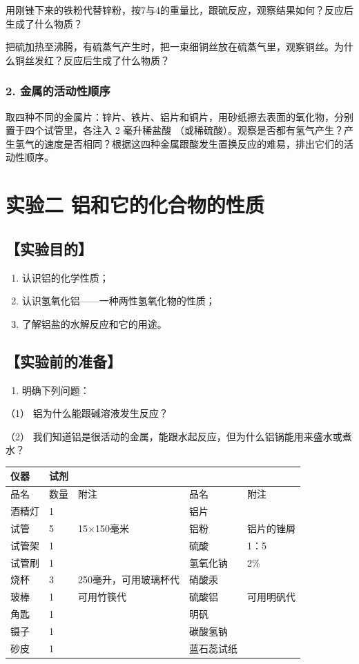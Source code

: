 用刚锉下来的铁粉代替锌粉，按7与4的重量比，跟硫反应，观察结果如何？反应后生成了什么物质？

把硫加热至沸腾，有硫蒸气产生时，把一束细铜丝放在硫蒸气里，观察铜丝。为什么铜丝发红？反应后生成了什么物质？

\subsubsection{2. 金属的活动性顺序}

取四种不同的金属片：锌片、铁片、铝片和铜片，用砂纸擦去表面的氧化物，分别置于四个试管里，各注入
2 毫升稀盐酸
（或稀硫酸）。观察是否都有氢气产生？产生氢气的速度是否相同？根据这四种金属跟酸发生置换反应的难易，排出它们的活动性顺序。

\section{实验二 铝和它的化合物的性质}

\subsection{【实验目的】}

\begin{enumerate}
\item
  认识铝的化学性质；
\item
  认识氢氧化铝------一种两性氢氧化物的性质；
\item
  了解铝盐的水解反应和它的用途。
\end{enumerate}

\subsection{【实验前的准备】}

\begin{enumerate}
\item
  明确下列问题：
\end{enumerate}

（1） 铝为什么能跟碱溶液发生反应？

（2）
我们知道铝是很活动的金属，能跟水起反应，但为什么铝锅能用来盛水或煮水？

{\def\LTcaptype{none} %
\begin{longtable}[]{@{}lllll@{}}
\toprule\noalign{}
仪器 & 试剂 & & & \\
\midrule\noalign{}
\endhead
\bottomrule\noalign{}
\endlastfoot
品名 & 数量 & 附注 & 品名 & 附注 \\
酒精灯 & 1 & & 铝片 & \\
试管 & 5 & 15×150毫米 & 铝粉 & 铝片的锉屑 \\
试管架 & 1 & & 硫酸 & 1：5 \\
试管刷 & 1 & & 氢氧化钠 & 2\% \\
烧杯 & 3 & 250毫升，可用玻璃杯代 & 硝酸汞 & \\
玻棒 & 1 & 可用竹筷代 & 硫酸铝 & 可用明矾代 \\
角匙 & 1 & & 明矾 & \\
镊子 & 1 & & 碳酸氢钠 & \\
砂皮 & 1 & & 蓝石蕊试纸 & \\
\end{longtable}
}

